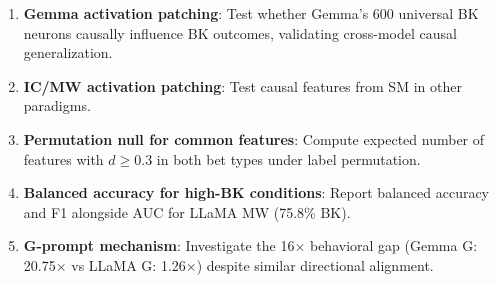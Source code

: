 \documentclass[11pt,a4paper]{article}
\begin{document}
\begin{enumerate}[leftmargin=2em]
    \item \textbf{Gemma activation patching}: Test whether Gemma's 600 universal BK neurons causally influence BK outcomes, validating cross-model causal generalization.
    \item \textbf{IC/MW activation patching}: Test causal features from SM in other paradigms.
    \item \textbf{Permutation null for common features}: Compute expected number of features with $d$$\geq$0.3 in both bet types under label permutation.
    \item \textbf{Balanced accuracy for high-BK conditions}: Report balanced accuracy and F1 alongside AUC for LLaMA MW (75.8\% BK).
    \item \textbf{G-prompt mechanism}: Investigate the 16$\times$ behavioral gap (Gemma G: 20.75$\times$ vs LLaMA G: 1.26$\times$) despite similar directional alignment.
\end{enumerate}
\end{document}
